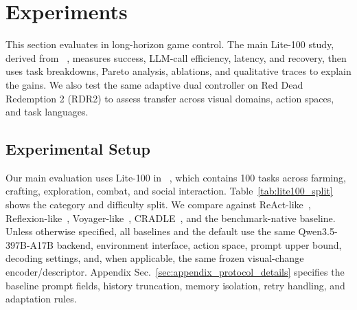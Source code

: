 \section{Experiments}
\label{sec:experiments}
\begingroup
\setlength{\textfloatsep}{8pt plus 2pt minus 2pt}
\setlength{\floatsep}{6pt plus 2pt minus 2pt}
\setlength{\intextsep}{6pt plus 2pt minus 2pt}

This section evaluates \method{} in long-horizon game control. The main
Lite-100 study, derived from \stardojo{}~\citep{tan2025stardojo}, measures
success, LLM-call efficiency, latency, and recovery, then uses task breakdowns,
Pareto analysis, ablations, and qualitative traces to explain the gains. We also
test the same adaptive dual controller on Red Dead Redemption 2 (RDR2) to assess
transfer across visual domains, action spaces, and task languages.

\subsection{Experimental Setup}

\begin{table}
    \vspace{-1em}
    \centering
    \scriptsize
    \caption{\textbf{Lite-100 task statistics.}}
    \label{tab:lite100_split}
    \vspace{-2em}
\end{table}


Our main evaluation uses Lite-100 in \stardojo{}~\citep{tan2025stardojo}, which
contains 100 tasks across farming, crafting, exploration, combat, and social
interaction. Table~\mbox{\ref{tab:lite100_split}} shows the category and
difficulty split. We compare against ReAct-like~\citep{yao2023react},
Reflexion-like~\citep{shinn2023reflexion}, Voyager-like~\citep{wang2024voyager},
CRADLE~\citep{tan2024cradle}, and the benchmark-native \stardojo{} baseline.
Unless otherwise specified, all baselines and the default \method{} use the same
Qwen3.5-397B-A17B backend, environment interface, action space, prompt upper
bound, decoding settings, and, when applicable, the same frozen visual-change
encoder/descriptor. Appendix
Sec.~\mbox{\ref{sec:appendix_protocol_details}} specifies the baseline prompt
fields, history truncation, memory isolation, retry handling, and adaptation
rules.

